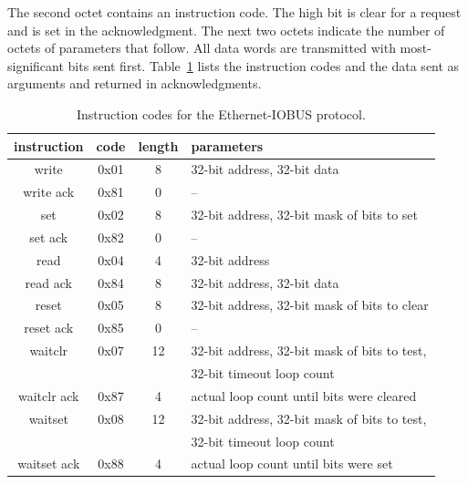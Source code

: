 \documentclass[11pt]{article}
\begin{document}
The second octet contains an instruction code.  The high bit is clear for a
request and is set in the acknowledgment.  The next two octets indicate the
number of octets of parameters that follow.  All data words are transmitted
with most-significant bits sent first.  Table~\ref{tab-ethio} lists the
instruction codes and the data sent as arguments and returned in
acknowledgments.
\begin{table}
  \begin{center}
    \begin{tabular}{|c|c|c|l|} \hline
  instruction & code & length & parameters  \\ \hline
write & 0x01 & 8 & 32-bit address, 32-bit data \\
write ack & 0x81 & 0 & -- \\ \hline
set & 0x02 & 8 & 32-bit address, 32-bit mask of bits to set \\
set ack & 0x82 & 0 & -- \\ \hline
read & 0x04 & 4 & 32-bit address \\
read ack & 0x84 & 8 & 32-bit address, 32-bit data \\ \hline
reset & 0x05 & 8 & 32-bit address, 32-bit mask of bits to clear \\
reset ack & 0x85 & 0 & -- \\ \hline
waitclr & 0x07 & 12 & 32-bit address, 32-bit mask of bits to test, \\
        &      &    & 32-bit timeout loop count \\
waitclr ack & 0x87 & 4 & actual loop count until bits were cleared \\ \hline
waitset & 0x08 & 12 & 32-bit address, 32-bit mask of bits to test, \\
        &      &    & 32-bit timeout loop count \\
waitset ack & 0x88 & 4 & actual loop count until bits were set \\ \hline
    \end{tabular}
  \end{center}
\caption{\label{tab-ethio}Instruction codes for the Ethernet-IOBUS protocol.}
\end{table}
\end{document}
